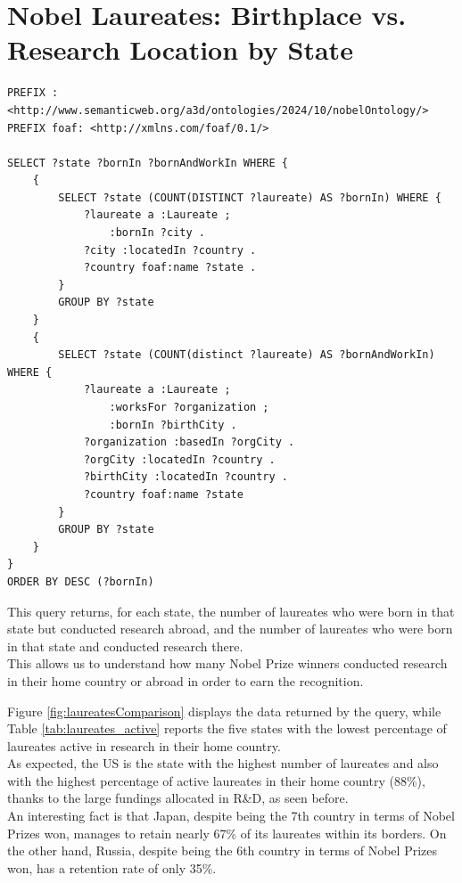 \documentclass{article}
\begin{document}
\newpage

\section{Nobel Laureates: Birthplace vs. Research Location by State}
\begin{lstlisting}
PREFIX : <http://www.semanticweb.org/a3d/ontologies/2024/10/nobelOntology/>
PREFIX foaf: <http://xmlns.com/foaf/0.1/>

SELECT ?state ?bornIn ?bornAndWorkIn WHERE {
    {
        SELECT ?state (COUNT(DISTINCT ?laureate) AS ?bornIn) WHERE {
            ?laureate a :Laureate ;
                :bornIn ?city .
            ?city :locatedIn ?country .
            ?country foaf:name ?state .
        }
        GROUP BY ?state
    }
    {
        SELECT ?state (COUNT(distinct ?laureate) AS ?bornAndWorkIn) WHERE {
            ?laureate a :Laureate ;
                :worksFor ?organization ;
                :bornIn ?birthCity .
            ?organization :basedIn ?orgCity .
            ?orgCity :locatedIn ?country .
            ?birthCity :locatedIn ?country .
            ?country foaf:name ?state
        }
        GROUP BY ?state
    }
}
ORDER BY DESC (?bornIn)
\end{lstlisting}

\noindent This query returns, for each state, the number of laureates who were born in that state but conducted research abroad, and the number of
laureates who were born in that state and conducted research there.\\
This allows us to understand how many Nobel Prize winners conducted research in their home country or abroad in order to earn the recognition.

Figure \ref{fig:laureatesComparison} displays the data returned by the query, while Table \ref{tab:laureates_active} reports the five states with the lowest percentage
of laureates active in research in their home country.\\
As expected, the US is the state with the highest number of laureates and also with the highest percentage
of active laureates in their home country (88\%), thanks to the large fundings allocated in R\&D, as seen before.\\
An interesting fact is that Japan, despite being the 7th country in terms of Nobel Prizes won, manages to retain nearly 67\% of its laureates
within its borders. On the other hand, Russia, despite being the 6th country in terms of Nobel Prizes won, has a retention rate of only 35\%.
\end{document}
